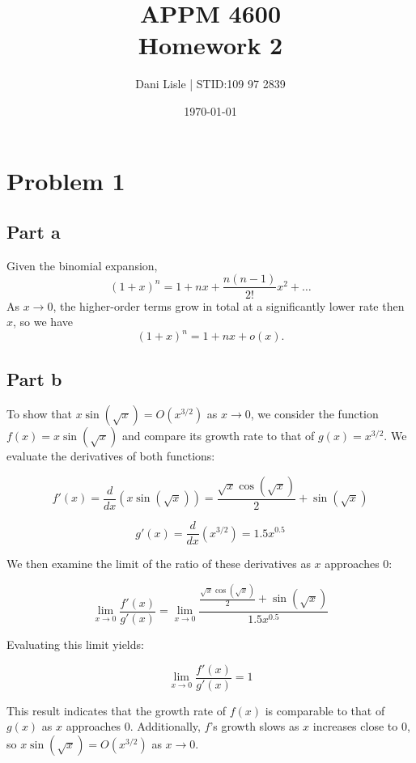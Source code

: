 \documentclass[12pt]{article}
\title{APPM 4600 \\ Homework 2}
\author{Dani Lisle | STID:109 97 2839}
\date{\today}
\begin{document}
\maketitle

\section*{Problem 1}
\subsection*{Part a}

Given the binomial expansion,
\begin{equation*}
(1 + x)^n = 1 + n x + \frac{n(n-1)}{2!}x^2 + \ldots
\end{equation*}
As \(x \rightarrow 0\), the higher-order terms grow in total at a significantly lower rate then $x$, so we have
\begin{equation*}
(1 + x)^n = 1 + n x + o(x).
\end{equation*}

\newpage

\subsection*{Part b}

To show that $x \sin(\sqrt{x}) = O(x^{3/2})$ as $x \rightarrow 0$, we consider the function $f(x) = x \sin(\sqrt{x})$ and compare its growth rate to that of $g(x) = x^{3/2}$. We evaluate the derivatives of both functions:

\[
f'(x) = \frac{d}{dx}\left( x \sin(\sqrt{x}) \right) = \frac{\sqrt{x} \cos(\sqrt{x})}{2} + \sin(\sqrt{x})
\]

\[
g'(x) = \frac{d}{dx}\left( x^{3/2} \right) = 1.5x^{0.5}
\]

We then examine the limit of the ratio of these derivatives as $x$ approaches 0:

\[
\lim_{x \to 0} \frac{f'(x)}{g'(x)} = \lim_{x \to 0} \frac{\frac{\sqrt{x} \cos(\sqrt{x})}{2} + \sin(\sqrt{x})}{1.5x^{0.5}}
\]

Evaluating this limit yields:

\[
\lim_{x \to 0} \frac{f'(x)}{g'(x)} = 1
\]

This result indicates that the growth rate of $f(x)$ is comparable to that of $g(x)$ as $x$ approaches 0. Additionally, $f$'s growth slows as $x$ increases close to $0$, so $x \sin(\sqrt{x}) = O(x^{3/2})$ as $x \rightarrow 0$.
\end{document}
